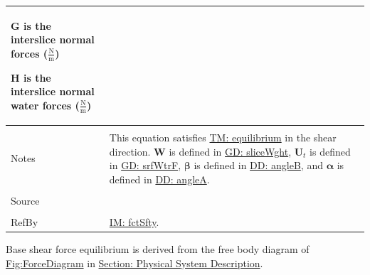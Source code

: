 \documentclass[12pt]{article}
\begin{document}
\begin{minipage}{\textwidth}
\begin{tabular}{p{} p{}}
\begin{symbDescription}
              \item{$\mathbf{G}$ is the interslice normal forces ($\frac{\text{N}}{\text{m}}$)}
              \item{$\mathbf{H}$ is the interslice normal water forces ($\frac{\text{N}}{\text{m}}$)}
              \end{symbDescription}
\\ \midrule \\
Notes & This equation satisfies \hyperref[TM:equilibrium]{TM: equilibrium} in the shear direction. $\mathbf{W}$ is defined in \hyperref[GD:sliceWght]{GD: sliceWght}, ${\mathbf{U}_{t}}$ is defined in \hyperref[GD:srfWtrF]{GD: srfWtrF}, $\mathbf{β}$ is defined in \hyperref[DD:angleB]{DD: angleB}, and $\mathbf{α}$ is defined in \hyperref[DD:angleA]{DD: angleA}.
\\ \midrule \\
Source & \cite{chen2005}
\\ \midrule \\
RefBy & \hyperref[IM:fctSfty]{IM: fctSfty}.
\\ \bottomrule \end{tabular}
\end{minipage}
Base shear force equilibrium is derived from the free body diagram of \hyperref[Figure:ForceDiagram]{Fig:ForceDiagram} in \hyperref[Sec:PhysSyst]{Section: Physical System Description}.
\par~
\end{document}

